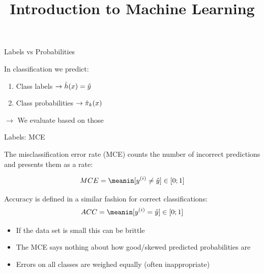\documentclass[11pt,compress,t,notes=noshow, xcolor=table]{beamer}
\title{Introduction to Machine Learning}
\institute{\href{https://compstat-lmu.github.io/lecture_i2ml/}{compstat-lmu.github.io/lecture\_i2ml}}
\date{}
\begin{document}














\begin{vbframe}{Labels vs Probabilities}

\lz
In classification we predict:

\lz
\begin{enumerate}
\item Class labels $\rightarrow \hat{h}(x) = \hat{y}$
\item Class probabilities $\rightarrow \hat \pi_k(x)$
\end{enumerate}

\lz
$\rightarrow$ We evaluate based on those


\end{vbframe}

\begin{vbframe}{Labels: MCE}

The misclassification error rate (MCE) counts the number of incorrect predictions and presents them as a rate:

\[
MCE = \meanin [\yi \neq \yih] \in [0;1]
\]

Accuracy is defined in a similar fashion for correct classifications:
\[
ACC = \meanin [\yi = \yih] \in [0;1]
\]

\begin{itemize}
\item If the data set is small this can be brittle
\item The MCE says nothing about how good/skewed predicted probabilities are
\item Errors on all classes are weighed equally (often inappropriate)
\end{itemize}
\end{vbframe}
\end{document}
